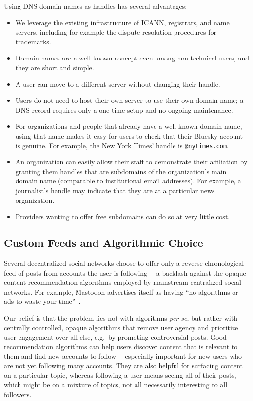 \documentclass[sigconf,review]{acmart}
\begin{document}
Using DNS domain names as handles has several advantages:
\begin{itemize}
    \item We leverage the existing infrastructure of ICANN, registrars, and name servers, including for example the dispute resolution procedures for trademarks.
    \item Domain names are a well-known concept even among non-technical users, and they are short and simple.
    \item A user can move to a different server without changing their handle.
    \item Users do not need to host their own server to use their own domain name; a DNS record requires only a one-time setup and no ongoing maintenance.
    \item For organizations and people that already have a well-known domain name, using that name makes it easy for users to check that their Bluesky account is genuine. For example, the New York Times' handle is \texttt{@nytimes.com}.
    \item An organization can easily allow their staff to demonstrate their affiliation by granting them handles that are subdomains of the organization's main domain name (comparable to institutional email addresses). For example, a journalist's handle may indicate that they are at a particular news organization.
    \item Providers wanting to offer free subdomains can do so at very little cost.
\end{itemize}

\subsection{Custom Feeds and Algorithmic Choice}\label{sec:feeds}

Several decentralized social networks choose to offer only a reverse-chronological feed of posts from accounts the user is following~-- a backlash against the opaque content recommendation algorithms employed by mainstream centralized social networks.
For example, Mastodon advertises itself as having ``no algorithms or ads to waste your time''~\cite{Mastodon}.

Our belief is that the problem lies not with algorithms \emph{per se}, but rather with centrally controlled, opaque algorithms that remove user agency and prioritize user engagement over all else, e.g.\ by promoting controversial posts.
Good recommendation algorithms can help users discover content that is relevant to them and find new accounts to follow~-- especially important for new users who are not yet following many accounts.
They are also helpful for surfacing content on a particular topic, whereas following a user means seeing all of their posts, which might be on a mixture of topics, not all necessarily interesting to all followers.
\end{document}
